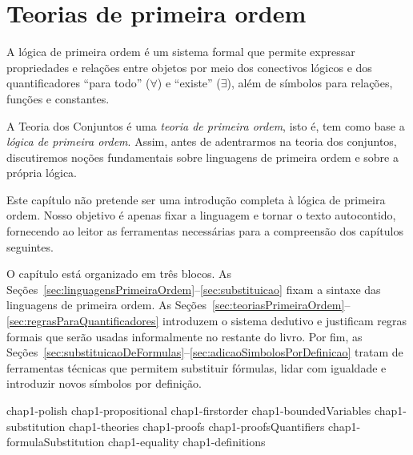 \chapter{Teorias de primeira ordem}\label{chap:teoriasPrimeiraOrdem}
A lógica de primeira ordem é um sistema formal que permite expressar propriedades e relações entre objetos por meio dos conectivos lógicos e dos quantificadores ``para todo'' ($\forall$) e ``existe'' ($\exists$), além de símbolos para relações, funções e constantes.

A Teoria dos Conjuntos é uma \emph{teoria de primeira ordem}, isto é, tem como base a \emph{lógica de primeira ordem}. 
Assim, antes de adentrarmos na teoria dos conjuntos, discutiremos noções fundamentais sobre linguagens de primeira ordem e sobre a própria lógica.

Este capítulo não pretende ser uma introdução completa à lógica de primeira ordem. 
Nosso objetivo é apenas fixar a linguagem e tornar o texto autocontido, fornecendo ao leitor as ferramentas necessárias para a compreensão dos capítulos seguintes.

O capítulo está organizado em três blocos. 
As Seções~\ref{sec:linguagensPrimeiraOrdem}--\ref{sec:substituicao} fixam a sintaxe das linguagens de primeira ordem. 
As Seções~\ref{sec:teoriasPrimeiraOrdem}--\ref{sec:regrasParaQuantificadores} introduzem o sistema dedutivo e justificam regras formais que serão usadas informalmente no restante do livro. 
Por fim, as Seções~\ref{sec:substituicaoDeFormulas}--\ref{sec:adicaoSimbolosPorDefinicao} tratam de ferramentas técnicas que permitem substituir fórmulas, lidar com igualdade e introduzir novos símbolos por definição.

{chap1-polish}
{chap1-propositional}
{chap1-firstorder}
{chap1-boundedVariables}
{chap1-substitution}
{chap1-theories}
{chap1-proofs}
{chap1-proofsQuantifiers}
{chap1-formulaSubstitution}
{chap1-equality}
{chap1-definitions}
